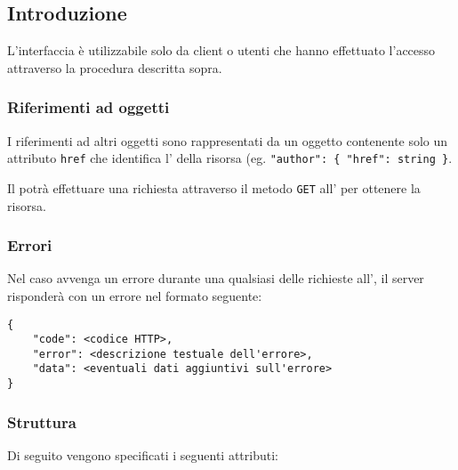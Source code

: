 \subsection{Introduzione}

    L'interfaccia  è utilizzabile solo da client o utenti che hanno effettuato l'accesso
    attraverso la procedura descritta sopra.
    
    \subsubsection{Riferimenti ad oggetti}
    \par I riferimenti ad altri oggetti sono rappresentati da un oggetto  contenente solo un attributo \texttt{href} che identifica l' della risorsa (eg. \texttt{"author": \{ "href": string \}}.
    
    \par Il  potrà effettuare una richiesta attraverso il metodo \texttt{GET} all' per ottenere la risorsa.
    

    \subsubsection{Errori}

        Nel caso avvenga un errore durante una qualsiasi delle richieste all', il server risponderà
        con un errore nel formato  seguente:

        \begin{lstlisting}[basicstyle={\ttfamily}]
{
    "code": <codice HTTP>,
    "error": <descrizione testuale dell'errore>,
    "data": <eventuali dati aggiuntivi sull'errore>
}
        \end{lstlisting}

    \subsubsection{Struttura}

        Di seguito vengono specificati i seguenti attributi:

